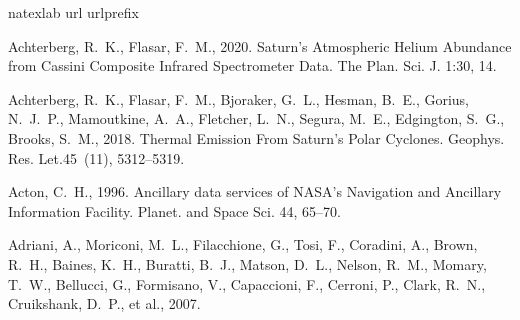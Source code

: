 \documentclass[article,11pt]{emulateapj}
\def\grl{Geophys. Res. Let.}
\begin{document}
%
%
\begin{thebibliography}{85}
\expandafter\ifx\csname natexlab\endcsname\relax\def\natexlab#1{#1}\fi
\expandafter\ifx\csname url\endcsname\relax
  \def\url#1{\texttt{#1}}\fi
\expandafter\ifx\csname urlprefix\endcsname\relax\def\urlprefix{URL }\fi

{Achterberg}, R.~K., {Flasar}, F.~M., 2020. {Saturn's Atmospheric Helium
  Abundance from Cassini Composite Infrared Spectrometer Data}. The Plan. Sci.
  J. 1:30, 14.

{Achterberg}, R.~K., {Flasar}, F.~M., {Bjoraker}, G.~L., {Hesman}, B.~E.,
  {Gorius}, N.~J.~P., {Mamoutkine}, A.~A., {Fletcher}, L.~N., {Segura}, M.~E.,
  {Edgington}, S.~G., {Brooks}, S.~M., 2018. {Thermal Emission From Saturn's
  Polar Cyclones}. \grl 45~(11), 5312--5319.

{Acton}, C.~H., 1996. {Ancillary data services of NASA's Navigation and
  Ancillary Information Facility}. Planet. and Space Sci. 44, 65--70.

{Adriani}, A., {Moriconi}, M.~L., {Filacchione}, G., {Tosi}, F., {Coradini},
  A., {Brown}, R.~H., {Baines}, K.~H., {Buratti}, B.~J., {Matson}, D.~L.,
  {Nelson}, R.~M., {Momary}, T.~W., {Bellucci}, G., {Formisano}, V.,
  {Capaccioni}, F., {Cerroni}, P., {Clark}, R.~N., {Cruikshank}, D.~P.,
 {et al.},
2007.


\end{thebibliography}
\end{document}
